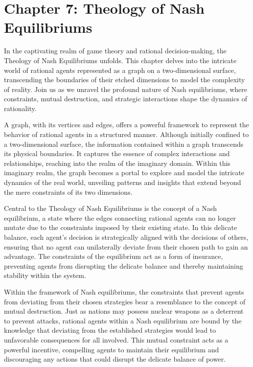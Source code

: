\documentclass[ebook,12pt,oneside,openany]{memoir}
\begin{document}
\chapter*{Chapter 7: Theology of Nash Equilibriums}


\indent \indent In the captivating realm of game theory and rational decision-making, the Theology of Nash Equilibriums unfolds. This chapter delves into the intricate world of rational agents represented as a graph on a two-dimensional surface, transcending the boundaries of their etched dimensions to model the complexity of reality. Join us as we unravel the profound nature of Nash equilibriums, where constraints, mutual destruction, and strategic interactions shape the dynamics of rationality.

\indent A graph, with its vertices and edges, offers a powerful framework to represent the behavior of rational agents in a structured manner. Although initially confined to a two-dimensional surface, the information contained within a graph transcends its physical boundaries. It captures the essence of complex interactions and relationships, reaching into the realm of the imaginary domain. Within this imaginary realm, the graph becomes a portal to explore and model the intricate dynamics of the real world, unveiling patterns and insights that extend beyond the mere constraints of its two dimensions.

\indent Central to the Theology of Nash Equilibriums is the concept of a Nash equilibrium, a state where the edges connecting rational agents can no longer mutate due to the constraints imposed by their existing state. In this delicate balance, each agent's decision is strategically aligned with the decisions of others, ensuring that no agent can unilaterally deviate from their chosen path to gain an advantage. The constraints of the equilibrium act as a form of insurance, preventing agents from disrupting the delicate balance and thereby maintaining stability within the system.

\indent Within the framework of Nash equilibriums, the constraints that prevent agents from deviating from their chosen strategies bear a resemblance to the concept of mutual destruction. Just as nations may possess nuclear weapons as a deterrent to prevent attacks, rational agents within a Nash equilibrium are bound by the knowledge that deviating from the established strategies would lead to unfavorable consequences for all involved. This mutual constraint acts as a powerful incentive, compelling agents to maintain their equilibrium and discouraging any actions that could disrupt the delicate balance of power.
\end{document}
